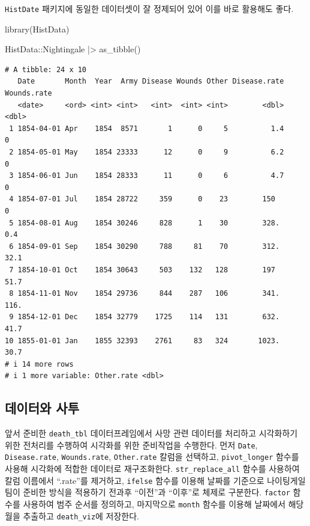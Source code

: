 \documentclass[
  letterpaper,
  chapter,a4paper,showtrims,openright,hidelinks]{oblivoir}
\newenvironment{Shaded}{\begin{snugshade}}{\end{snugshade}}
\newcommand{\FunctionTok}[1]{\textcolor[rgb]{0.28,0.35,0.67}{#1}}
\newcommand{\NormalTok}[1]{\textcolor[rgb]{0.00,0.23,0.31}{#1}}
\newcommand{\SpecialCharTok}[1]{\textcolor[rgb]{0.37,0.37,0.37}{#1}}
\begin{document}
\texttt{HistDate} 패키지에 동일한 데이터셋이 잘 정제되어 있어 이를 바로
활용해도 좋다.

\begin{Shaded}
\begin{Highlighting}[]
\FunctionTok{library}\NormalTok{(HistData)}

\NormalTok{HistData}\SpecialCharTok{::}\NormalTok{Nightingale }\SpecialCharTok{|\textgreater{}} 
  \FunctionTok{as\_tibble}\NormalTok{()}
\end{Highlighting}
\end{Shaded}

\begin{verbatim}
# A tibble: 24 x 10
   Date       Month  Year  Army Disease Wounds Other Disease.rate Wounds.rate
   <date>     <ord> <int> <int>   <int>  <int> <int>        <dbl>       <dbl>
 1 1854-04-01 Apr    1854  8571       1      0     5          1.4         0  
 2 1854-05-01 May    1854 23333      12      0     9          6.2         0  
 3 1854-06-01 Jun    1854 28333      11      0     6          4.7         0  
 4 1854-07-01 Jul    1854 28722     359      0    23        150           0  
 5 1854-08-01 Aug    1854 30246     828      1    30        328.          0.4
 6 1854-09-01 Sep    1854 30290     788     81    70        312.         32.1
 7 1854-10-01 Oct    1854 30643     503    132   128        197          51.7
 8 1854-11-01 Nov    1854 29736     844    287   106        341.        116. 
 9 1854-12-01 Dec    1854 32779    1725    114   131        632.         41.7
10 1855-01-01 Jan    1855 32393    2761     83   324       1023.         30.7
# i 14 more rows
# i 1 more variable: Other.rate <dbl>
\end{verbatim}

\hypertarget{uxb370uxc774uxd130uxc640-uxc0acuxd22c}{%
\subsection{데이터와 사투}\label{uxb370uxc774uxd130uxc640-uxc0acuxd22c}}

앞서 준비한 \texttt{death\_tbl} 데이터프레임에서 사망 관련 데이터를
처리하고 시각화하기 위한 전처리를 수행하여 시각화를 위한 준비작업을
수행한다. 먼저 \texttt{Date}, \texttt{Disease.rate},
\texttt{Wounds.rate}, \texttt{Other.rate} 칼럼을 선택하고,
\texttt{pivot\_longer} 함수를 사용해 시각화에 적합한 데이터로
재구조화한다. \texttt{str\_replace\_all} 함수를 사용하여 칼럼 이름에서
``.rate''를 제거하고, \texttt{ifelse} 함수를 이용해 날짜를 기준으로
나이팅게일 팀이 준비한 방식을 적용하기 전과후 ``이전''과 ``이후''로
체제로 구분한다. \texttt{factor} 함수를 사용하여 범주 순서를 정의하고,
마지막으로 \texttt{month} 함수를 이용해 날짜에서 해당 월을 추출하고
\texttt{death\_viz}에 저장한다.
\end{document}
